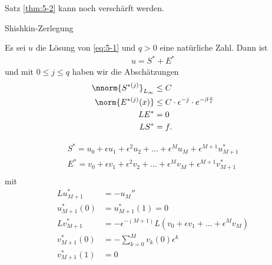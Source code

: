 Satz \ref{thm:5-2} kann noch verschärft werden.
\begin{lemma}\label{lem:5-3} Shishkin-Zerlegung
  
Es sei $u$ die Lösung von \eqref{eq:5-1} und $q >0$ eine natürliche Zahl. Dann ist
\begin{align*}
  u = S^{*} + E^{*}
\end{align*}
und mit $0 \leq j\leq q$ haben wir die Abschätzungen
\begin{align*}
   \nnorm{S^{*(j)}}_{L_{\infty}} &\leq C\\
\norm{E^{*(j)} (x)} &\leq C\cdot \epsilon^{-j}\cdot e^{- \beta \frac x \epsilon}\\
LE^{*} &= 0\\
LS^{*} &= f. 
\end{align*}
\end{lemma}
\begin{beweisidee}
  \begin{align*}
      S^{*} = u_{0} + \epsilon u_{1} + \epsilon^{2} u_{2} + \dots + \epsilon^{M} u_{M} + \epsilon^{M+1}u^{*}_{M+1}\\
      E^{*} = v_{0} + \epsilon v_{1} + \epsilon^{2} v_{2} + \dots + \epsilon^{M} v_{M} + \epsilon^{M+1}v^{*}_{M+1}\\
  \end{align*}
mit
\begin{align*}
  Lu^{*}_{M+1} &= - u_{M}''\\
  u_{M+1}^{*}(0) &= u^{*}_{M+1}(1) = 0\\
  Lv^{*}_{M+1} &= - \epsilon^{-(M+1)} L(v_{0} + \epsilon v_{1} + \dots + \epsilon^{M}v_{M})\\
  v_{M+1}^{*}(0) &= - \sum_{k = 0}^{M} v_{k}(0) \epsilon^{k}\\
  v_{M+1}^{*}(1) &= 0
\end{align*}
\end{beweisidee}

